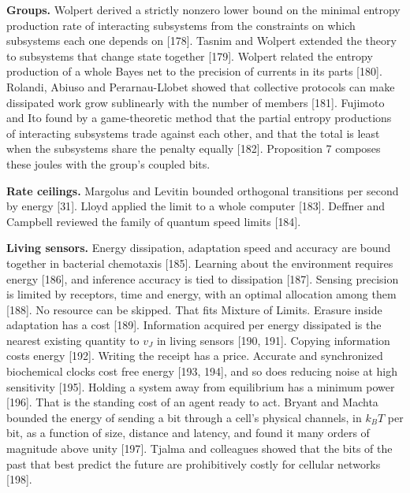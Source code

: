 \documentclass[
  10pt,
]{article}
\begin{document}
\textbf{Groups.} Wolpert derived a strictly nonzero lower bound on the
minimal entropy production rate of interacting subsystems from the
constraints on which subsystems each one depends on {[}178{]}. Tasnim
and Wolpert extended the theory to subsystems that change state together
{[}179{]}. Wolpert related the entropy production of a whole Bayes net
to the precision of currents in its parts {[}180{]}. Rolandi, Abiuso and
Perarnau-Llobet showed that collective protocols can make dissipated
work grow sublinearly with the number of members {[}181{]}. Fujimoto and
Ito found by a game-theoretic method that the partial entropy
productions of interacting subsystems trade against each other, and that
the total is least when the subsystems share the penalty equally
{[}182{]}. Proposition 7 composes these joules with the group's coupled
bits.

\textbf{Rate ceilings.} Margolus and Levitin bounded orthogonal
transitions per second by energy {[}31{]}. Lloyd applied the limit to a
whole computer {[}183{]}. Deffner and Campbell reviewed the family of
quantum speed limits {[}184{]}.

\textbf{Living sensors.} Energy dissipation, adaptation speed and
accuracy are bound together in bacterial chemotaxis {[}185{]}. Learning
about the environment requires energy {[}186{]}, and inference accuracy
is tied to dissipation {[}187{]}. Sensing precision is limited by
receptors, time and energy, with an optimal allocation among them
{[}188{]}. No resource can be skipped. That fits Mixture of Limits.
Erasure inside adaptation has a cost {[}189{]}. Information acquired per
energy dissipated is the nearest existing quantity to \(v_J\) in living
sensors {[}190, 191{]}. Copying information costs energy {[}192{]}.
Writing the receipt has a price. Accurate and synchronized biochemical
clocks cost free energy {[}193, 194{]}, and so does reducing noise at
high sensitivity {[}195{]}. Holding a system away from equilibrium has a
minimum power {[}196{]}. That is the standing cost of an agent ready to
act. Bryant and Machta bounded the energy of sending a bit through a
cell's physical channels, in \(k_B T\) per bit, as a function of size,
distance and latency, and found it many orders of magnitude above unity
{[}197{]}. Tjalma and colleagues showed that the bits of the past that
best predict the future are prohibitively costly for cellular networks
{[}198{]}.
\end{document}
